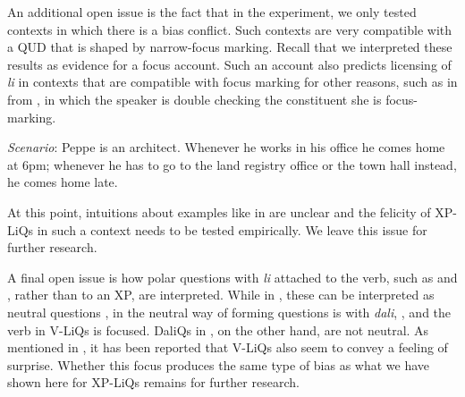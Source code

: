 \documentclass[output=paper]{langscibook}
\begin{document}


An additional open issue is the fact that in the experiment, we only tested contexts in which there is a bias conflict. Such contexts are very compatible with a QUD that is shaped by narrow-focus marking. Recall that we interpreted these results as evidence for a focus account. Such an account also predicts licensing of \textit{li} in contexts that are compatible with focus marking for other reasons, such as in  from \citet{bianchi.bocci.cruschina2016}, in which the speaker is double checking the constituent she is focus-marking.


\eanoraggedright
\textit{Scenario}: Peppe is an architect. Whenever he works in his office he comes home at 6pm; whenever he has to go to the land registry office or the town hall instead, he comes home late.
\begin{xlist}
\end{xlist}\label{doubleask}
\z

\noindent
At this point, intuitions about examples like  in  are unclear and the felicity of XP-LiQs in such a context needs to be tested empirically. We leave this issue for further research.

A final open issue is how polar questions with \textit{li} attached to the verb, such as  and , rather than to an XP, are interpreted. While in , these can be interpreted as neutral questions \citep{Rudin.Kramer.Billings.Baerman1999, dukova2010}, in  the neutral way of forming questions is with \textit{dali}, , and the verb in V-LiQs is focused. DaliQs in , on the other hand, are not neutral. As mentioned in , it has been reported that V-LiQs also seem to convey a feeling of surprise. Whether this focus produces the same type of bias as what we have shown here for XP-LiQs remains for further research.
\end{document}
